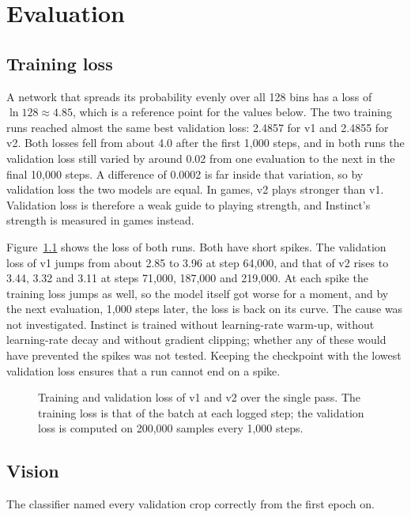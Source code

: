 \chapter{Evaluation}
\label{chap:evaluation}

\section{Training loss}
\label{sec:training-loss}

A network that spreads its probability evenly over all 128 bins has a loss
of $\ln 128 \approx 4.85$, which is a reference point for the values below.
The two training runs reached almost the same best validation loss: 2.4857
for v1 and 2.4855 for v2. Both
losses fell from about 4.0 after the first 1,000 steps, and in both runs the
validation loss still varied by around 0.02 from one evaluation to the next
in the final 10,000 steps. A difference of 0.0002 is far inside that
variation, so by validation loss the two models are equal.
In games, v2 plays stronger than v1. Validation loss is
therefore a weak guide to playing strength, and Instinct's strength is
measured in games instead.

Figure~\ref{fig:loss} shows the loss of both runs. Both have short spikes.
The validation loss of v1 jumps from about 2.85 to 3.96 at step 64,000, and
that of v2 rises to 3.44, 3.32 and 3.11 at steps 71,000, 187,000 and
219,000. At each spike the training loss jumps as well, so the model itself
got worse for a moment, and by the next evaluation, 1,000 steps later, the
loss is back on its curve. The cause was not investigated. Instinct is
trained without learning-rate warm-up, without learning-rate decay and
without gradient clipping; whether any of these would have prevented the
spikes was not tested. Keeping the checkpoint with the lowest validation
loss ensures that a run cannot end on a spike.

\begin{figure}[htbp]
  \centering
  
  \caption{Training and validation loss of v1 and v2 over the single pass. The
    training loss is that of the batch at each logged step; the validation loss
    is computed on 200,000 samples every 1,000 steps.}
  \label{fig:loss}
\end{figure}

\section{Vision}
\label{sec:vision}

The classifier named every validation crop correctly from the first epoch on.
